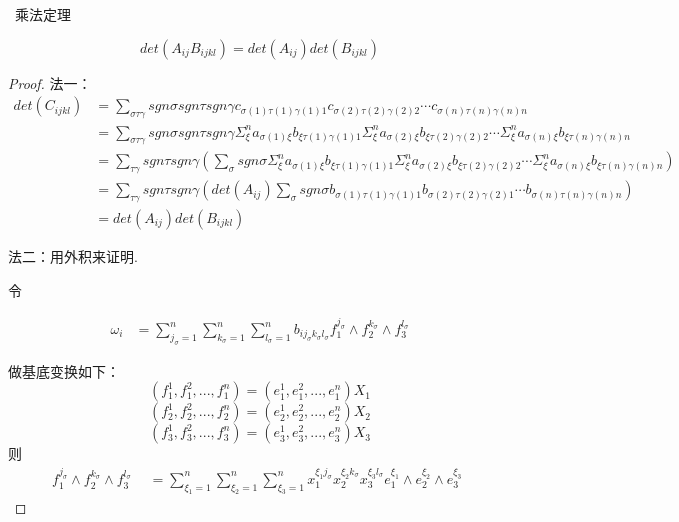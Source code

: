 \documentclass[twoside,a4paper,CCT]{cctart}   %
\begin{document}
\begin{theorem}\   乘法定理

    $$det(A_{ij}B_{ijkl})=det(A_{ij})det(B_{ijkl})$$
\end{theorem}

\begin{proof}

法一：
\begin{align*}
det(C_{ijkl})&=\sum \limits_{\sigma\tau\gamma}sgn\sigma sgn\tau sgn\gamma c_{\sigma(1)\tau(1)\gamma(1)1} c_{\sigma(2)\tau(2)\gamma(2)2}\cdots c_{\sigma(n)\tau(n)\gamma(n)n}\\
&=\sum \limits_{\sigma\tau\gamma}sgn\sigma sgn\tau sgn\gamma \Sigma_{\xi}^{n}a_{\sigma(1)\xi}b_{\xi \tau(1)\gamma(1)1} \Sigma_{\xi}^{n}a_{\sigma(2)\xi}b_{\xi \tau(2)\gamma(2)2}\cdots \Sigma_{\xi}^{n}a_{\sigma(n)\xi}b_{\xi \tau(n)\gamma(n)n}\\
&=\sum \limits_{\tau\gamma}sgn\tau sgn\gamma(\sum \limits_{\sigma}sgn\sigma  \Sigma_{\xi}^{n}a_{\sigma(1)\xi}b_{\xi \tau(1)\gamma(1)1} \Sigma_{\xi}^{n}a_{\sigma(2)\xi}b_{\xi \tau(2)\gamma(2)2}\cdots \Sigma_{\xi}^{n}a_{\sigma(n)\xi}b_{\xi \tau(n)\gamma(n)n})\\
&=\sum \limits_{\tau\gamma}sgn\tau sgn\gamma(det(A_{ij})\sum \limits_{\sigma}sgn\sigma b_{\sigma(1) \tau(1)\gamma(1)1} b_{\sigma(2) \tau(2)\gamma(2)1} \cdots b_{\sigma(n) \tau(n)\gamma(n)n})\\
&=det(A_{ij})det(B_{ijkl})
\end{align*}

法二：用外积来证明.

令

\begin{equation}
\begin{aligned}
\omega_{i}
&= \sum_{j_{\sigma}=1}^{n}\sum_{k_{\sigma}=1}^{n}\sum_{l_{\sigma}=1}^{n}b_{ij_{\sigma}k_{\sigma}l_{\sigma}} f_{1}^{j_{\sigma}} \wedge f_{2}^{k_{\sigma}} \wedge f_{3}^{l_{\sigma}}
\end{aligned}
\end{equation}

做基底变换如下：
$$(f_{1}^{1},f_{1}^{2},...,f_{1}^{n})=(e_{1}^{1},e_{1}^{2},...,e_{1}^{n})X_{1}$$
$$(f_{2}^{1},f_{2}^{2},...,f_{2}^{n})=(e_{2}^{1},e_{2}^{2},...,e_{2}^{n})X_{2}$$
$$(f_{3}^{1},f_{3}^{2},...,f_{3}^{n})=(e_{3}^{1},e_{3}^{2},...,e_{3}^{n})X_{3}$$
则
\begin{equation}
f_{1}^{j_{\sigma}}\wedge f_{2}^{k_{\sigma}}\wedge f_{3}^{l_{\sigma}}
\begin{aligned}
& = \sum_{\xi_{1}=1}^{n}\sum_{\xi_{2}=1}^{n}\sum_{\xi_{3}=1}^{n}x_{1}^{\xi_{1}j_{\sigma}}x_{2}^{\xi_{2}k_{\sigma}}x_{3}^{\xi_{
3}l_{\sigma}}e_{1}^{\xi_{1}}\wedge e_{2}^{\xi_{2}}\wedge e_{3}^{\xi_{3}}
\end{aligned}
\end{equation}


\end{proof}
\end{document}
